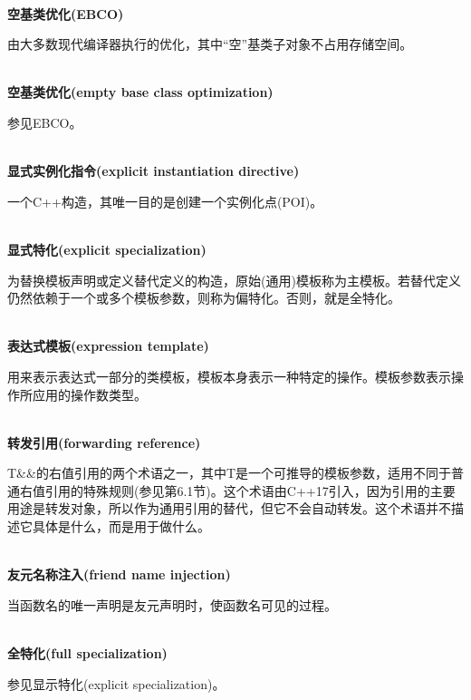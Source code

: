 \hspace*{\fill} \\ %
\noindent
\textbf{空基类优化(EBCO)}

由大多数现代编译器执行的优化，其中“空”基类子对象不占用存储空间。

\hspace*{\fill} \\ %
\noindent
\textbf{空基类优化(empty base class optimization)}

参见EBCO。

\hspace*{\fill} \\ %
\noindent
\textbf{显式实例化指令(explicit instantiation directive)}

一个C++构造，其唯一目的是创建一个实例化点(POI)。

\hspace*{\fill} \\ %
\noindent
\textbf{显式特化(explicit specialization)}

为替换模板声明或定义替代定义的构造，原始(通用)模板称为主模板。若替代定义仍然依赖于一个或多个模板参数，则称为偏特化。否则，就是全特化。

\hspace*{\fill} \\ %
\noindent
\textbf{表达式模板(expression template)}

用来表示表达式一部分的类模板，模板本身表示一种特定的操作。模板参数表示操作所应用的操作数类型。

\hspace*{\fill} \\ %
\noindent
\textbf{转发引用(forwarding reference)}

T\&\&的右值引用的两个术语之一，其中T是一个可推导的模板参数，适用不同于普通右值引用的特殊规则(参见第6.1节)。这个术语由C++17引入，因为引用的主要用途是转发对象，所以作为通用引用的替代，但它不会自动转发。这个术语并不描述它具体是什么，而是用于做什么。

\hspace*{\fill} \\ %
\noindent
\textbf{友元名称注入(friend name injection)}

当函数名的唯一声明是友元声明时，使函数名可见的过程。

\hspace*{\fill} \\ %
\noindent
\textbf{全特化(full specialization)}

参见显示特化(explicit specialization)。

